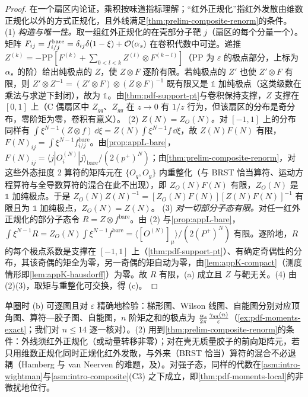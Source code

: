 \begin{proof}
在一个扇区内论证，乘积按味道指标理解；“红外正规化”指红外发散由维数正规化以外的方式正规化，且外线满足\cref{thm:prelim-composite-renorm}的条件。
(1) \emph{构造与唯一性。}取一组红外正规化的在壳部分子靶 $j$（扇区的每个分量一个）。矩阵 $F_{ij}=f^{\mathrm{bare}}_{i/j}=\delta_{ij}\delta(1-\xi)+\mathcal{O}\!\left(\alpha_s\right)$ 在卷积代数中可逆。递推 $Z^{(k)}=-\mathrm{PP}[F^{(k)}+\sum_{0<l<k}Z^{(l)}\otimes F^{(k-l)}]$（$\mathrm{PP}$ 为 $\varepsilon$ 的极点部分，上标为 $\alpha_s$ 的阶）给出纯极点的 $Z$，使 $Z\otimes F$ 逐阶有限。若纯极点的 $Z'$ 也使 $Z'\otimes F$ 有限，则 $Z'\otimes Z^{-1}=(Z'\otimes F)\otimes(Z\otimes F)^{-1}$ 既有限又是 $\mathbb 1$ 加纯极点（这类级数在乘法与求逆下封闭），故为 $\mathbb 1$。由\cref{thm:pdf-support-pt}与卷积保持支撑，$Z$ 支撑在 $[0,1]$ 上（C 偶扇区中 $Z_{gq}$、$Z_{gg}$ 在 $z\to0$ 有 $1/z$ 行为，但该扇区的分布是奇分布，零阶矩为零，卷积有意义）。
(2) \emph{$Z(N)=Z_O(N)$。}对 $[-1,1]$ 上的分布同样有 $\int\xi^{N-1}(Z\otimes f)\,\dd\xi=Z(N)\int\xi^{N-1}f\,\dd\xi$，故 $Z(N)F(N)$ 有限，$F(N)_{ij}=\int\xi^{N-1}f^{\mathrm{bare}}_{i/j}$。由\cref{prop:appL-bare}，$F(N)_{ij}=\langle j|O^{(N)}_i|j\rangle_{\mathrm{bare}}/(2(p^+)^N)$；由\cref{thm:prelim-composite-renorm}，对这些外态扭度 2 算符的矩阵元在 $\{O_q,O_g\}$ 内重整化（与 BRST 恰当算符、运动方程算符与全导数算符的混合在此不出现），即 $Z_O(N)F(N)$ 有限，$Z_O(N)$ 是 $\mathbb 1$ 加纯极点。于是 $Z_O(N)Z(N)^{-1}=[Z_O(N)F(N)][Z(N)F(N)]^{-1}$ 有限且为 $\mathbb 1$ 加纯极点，$Z_O(N)=Z(N)$。
(3) \emph{对一切部分子态有限。}对任一红外正规化的部分子态令 $R=Z\otimes f^{\mathrm{bare}}$。由 (2) 与\cref{prop:appL-bare}，$\int\xi^{N-1}R=Z_O(N)\int\xi^{N-1}f^{\mathrm{bare}}=\langle[O^{(N)}]_\mu\rangle/(2(P^+)^N)$ 有限。逐阶地，$R$ 的每个极点系数是支撑在 $[-1,1]$ 上（\cref{thm:pdf-support-pt}）、有确定奇偶性的分布，其该奇偶的矩全为零，另一奇偶的矩自动为零，由\cref{lem:appK-compact}（测度情形即\cref{lem:appK-hausdorff}）为零。故 $R$ 有限，(a) 成立且 $Z$ 与靶无关。(4) 由 (2)(3)，取矩与重整化可交换，得 (c)。
\end{proof}

单圈时 (b) 可逐图且对 $\varepsilon$ 精确地检验：梯形图、Wilson 线图、自能图分别对应顶角图、算符—胶子图、自能图，$n$ 阶矩之和的极点为 $\frac{\alpha_s}{2\pi}\frac{\gamma_{qq}(n)}{\varepsilon}$（\cref{ex:pdf-moments-exact}；我们对 $n\le14$ 逐一核对）。(2) 用到\cref{thm:prelim-composite-renorm}的条件：外线须红外正规化（或动量转移非零）；对在壳无质量胶子的前向矩阵元，若只用维数正规化同时正规化红外发散，与外来（BRST 恰当）算符的混合不必退耦（Hamberg 与 van Neerven 的难题\cite{Hamberg:1991qt}，及\cite{Collins:1994ee}）。对强子态，同样的代数在\cref{asm:intro-wightman}与\cref{asm:intro-composite}(C3) 之下成立，即\cref{thm:pdf-moments-local}的非微扰地位行。

